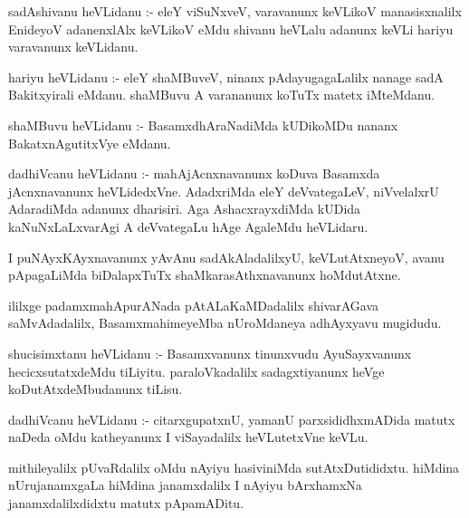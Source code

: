 \documentclass{article}
\begin{document}
\begin{mn}
sadAshivanu  heVLidanu :-  eleY  viSuNxveV,  varavanunx  keVLikoV  manasisxnalilx  EnideyoV  adanenxlAlx  
keVLikoV  eMdu  shivanu  heVLalu  adanunx  keVLi  hariyu  varavanunx  keVLidanu.
\end{mn}

\begin{mn}
hariyu  heVLidanu :- eleY  shaMBuveV,  ninanx  pAdayugagaLalilx  nanage  sadA  Bakitxyirali  eMdanu.  
shaMBuvu  A  varananunx  koTuTx  matetx  iMteMdanu. 
\end{mn}

\begin{mn}
shaMBuvu  heVLidanu :- BasamxdhAraNadiMda  kUDikoMDu  nananx  BakatxnAgutitxVye  eMdanu.
\end{mn}

\begin{mn}
dadhiVcanu  heVLidanu :- mahAjAcnxnavanunx  koDuva  Basamxda  jAcnxnavanunx  heVLidedxVne.  AdadxriMda  
eleY  deVvategaLeV,  niVvelalxrU AdaradiMda  adanunx  dharisiri.  Aga  AshacxrayxdiMda  kUDida  kaNuNxLaLxvarAgi  
A  deVvategaLu  hAge  AgaleMdu  heVLidaru. 
\end{mn}

\begin{mn}
I  puNAyxKAyxnavanunx  yAvAnu  sadAkAladalilxyU,  keVLutAtxneyoV,  avanu  pApagaLiMda  biDalapxTuTx  
shaMkarasAthxnavanunx  hoMdutAtxne.
\end{mn}

\begin{mn}
ililxge  padamxmahApurANada  pAtALaKaMDadalilx  shivarAGava saMvAdadalilx,  BasamxmahimeyeMba  nUroMdaneya  adhAyxyavu  mugidudu.
\end{mn}


\begin{mn}
shucisimxtanu  heVLidanu :- Basamxvanunx  tinunxvudu  AyuSayxvanunx  hecicxsutatxdeMdu  tiLiyitu.  
paraloVkadalilx  sadagxtiyanunx  heVge  koDutAtxdeMbudanunx  tiLisu.
\end{mn}

\begin{mn}
dadhiVcanu  heVLidanu :- citarxgupatxnU,  yamanU  parxsididhxmADida  matutx  naDeda  oMdu  katheyanunx  
I  viSayadalilx  heVLutetxVne  keVLu.
\end{mn}

\begin{mn}
mithileyalilx  pUvaRdalilx  oMdu  nAyiyu  hasiviniMda  sutAtxDutididxtu.  hiMdina  nUrujanamxgaLa  
hiMdina  janamxdalilx  I  nAyiyu  bArxhamxNa  janamxdalilxdidxtu  matutx  pApamADitu.
\end{mn}
\end{document}
